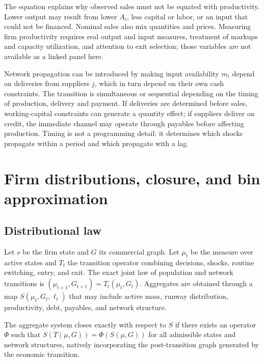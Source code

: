 \documentclass[11pt,a4paper]{article}
\begin{document}
The equation explains why observed sales must not be equated with productivity. Lower output may result from lower $A_i$, less capital or labor, or an input that could not be financed. Nominal sales also mix quantities and prices. Measuring firm productivity requires real output and input measures, treatment of markups and capacity utilization, and attention to exit selection; those variables are not available as a linked panel here.

Network propagation can be introduced by making input availability $m_i$ depend on deliveries from suppliers $j$, which in turn depend on their own cash constraints. The transition is simultaneous or sequential depending on the timing of production, delivery and payment. If deliveries are determined before sales, working-capital constraints can generate a quantity effect; if suppliers deliver on credit, the immediate channel may operate through payables before affecting production. Timing is not a programming detail: it determines which shocks propagate within a period and which propagate with a lag.

\section{Firm distributions, closure, and bin approximation}
\subsection{Distributional law}
Let $s$ be the firm state and $G$ its commercial graph. Let $\mu_t$ be the measure over active states and $T_t$ the transition operator combining decisions, shocks, routine switching, entry, and exit. The exact joint law of population and network transitions is $(\mu_{t+1}, G_{t+1}) = T_t(\mu_t, G_t)$. Aggregates are obtained through a map $S(\mu_t,G_t,\ell_t)$ that may include active mass, runway distribution, productivity, debt, payables, and network structure.

\begin{definition}
The aggregate system closes exactly with respect to $S$ if there exists an operator $\Phi$ such that $S(T(\mu, G)) = \Phi(S(\mu, G))$ for all admissible states and network structures, natively incorporating the post-transition graph generated by the economic transition.
\end{definition}
\end{document}
